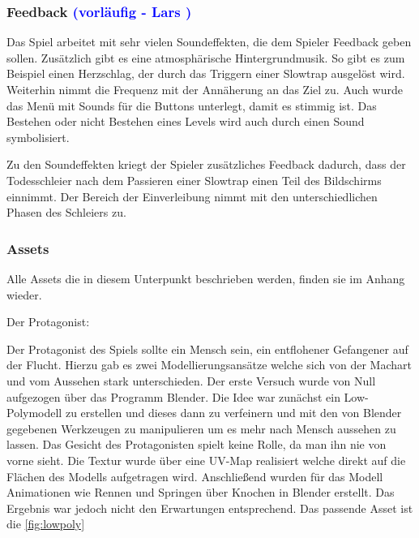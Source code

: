 \documentclass[12pt]{article}
\begin{document}
\vspace{1cm}
\subsubsection{Feedback \textcolor{blue}{(vorläufig - Lars )}}

Das Spiel arbeitet mit sehr vielen Soundeffekten, die dem Spieler Feedback geben sollen.
Zusätzlich gibt es eine atmosphärische Hintergrundmusik. So gibt es zum Beispiel einen Herzschlag, der durch das Triggern einer Slowtrap ausgelöst
wird. Weiterhin nimmt die Frequenz mit der Annäherung an das Ziel zu. Auch wurde das Menü mit Sounds für die Buttons unterlegt, damit es stimmig
ist. Das Bestehen oder nicht Bestehen eines Levels wird auch durch einen Sound symbolisiert. \newline

\noindent Zu den Soundeffekten kriegt der Spieler zusätzliches Feedback dadurch, dass der Todesschleier nach dem Passieren einer Slowtrap einen Teil des
Bildschirms einnimmt. Der Bereich der Einverleibung nimmt mit den unterschiedlichen Phasen des Schleiers zu. 

\vspace{1cm}
\subsubsection{Assets}

\tiny Alle Assets die in diesem Unterpunkt beschrieben werden, finden sie im Anhang wieder.\newline

\noindent Der Protagonist:\newline

\noindent Der Protagonist des Spiels sollte ein Mensch sein, ein entflohener Gefangener auf der Flucht. 
Hierzu gab es zwei Modellierungsansätze welche sich von der Machart und vom Aussehen stark unterschieden. 
Der erste Versuch wurde von Null aufgezogen über das Programm Blender. Die Idee war zunächst ein Low-Polymodell zu erstellen und dieses dann zu verfeinern
und mit den von Blender gegebenen Werkzeugen zu manipulieren um es mehr nach Mensch aussehen zu lassen. Das Gesicht des Protagonisten spielt keine Rolle,
da man ihn nie von vorne sieht. Die Textur wurde über eine UV-Map realisiert welche direkt auf die Flächen des Modells aufgetragen wird. 
Anschließend wurden für das Modell Animationen wie Rennen und Springen über Knochen in Blender erstellt. Das Ergebnis war jedoch nicht den Erwartungen entsprechend.
Das passende Asset ist die \ref{fig:lowpoly}\newline
\end{document}
